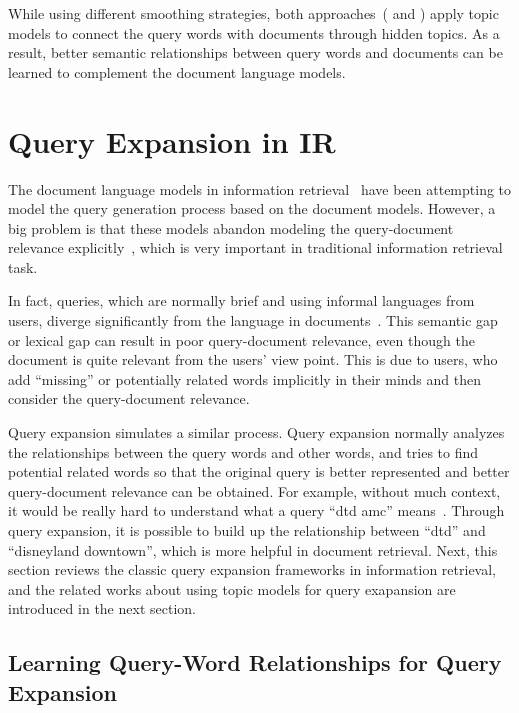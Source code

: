 While using different smoothing strategies, both
approaches~(\citep{wei-06} and \citep{Lu-2011}) apply topic models to
connect the query words with documents through hidden topics. As a
result, better semantic relationships between query words and
documents can be learned to complement the document language models.


\section{Query Expansion in IR}

The document language models in information
retrieval~\citep{PonteCroft} have been attempting to model the query
generation process based on the document models. However, a big
problem is that these models abandon modeling the query-document
relevance explicitly~\citep{Lavrenko-2001}, which is very important in
traditional information retrieval task.

In fact, queries, which are normally brief and using informal
languages from users, diverge significantly from the language in
documents~\citep{Muller-2009}. This semantic gap or lexical gap can
result in poor query-document relevance, even though the document is
quite relevant from the users' view point. This is due to users, who
add ``missing'' or potentially related words implicitly in their minds
and then consider the query-document relevance.

Query expansion simulates a similar process. Query expansion
normally analyzes the relationships between the query words and other
words, and tries to find potential related words so that the original
query is better represented and better query-document relevance can be
obtained. For example, without much context, it would be really hard 
to understand what a query ``dtd amc'' means~\citep{Jiang-2016}. Through
query expansion, it is possible to build up the relationship between ``dtd''
and ``disneyland downtown'', which is more helpful in document retrieval. 
Next, this section reviews the classic query expansion frameworks
in information retrieval, and the related works about using topic models
for query exapansion are introduced in the next section.

\subsection{Learning Query-Word Relationships for Query Expansion}

